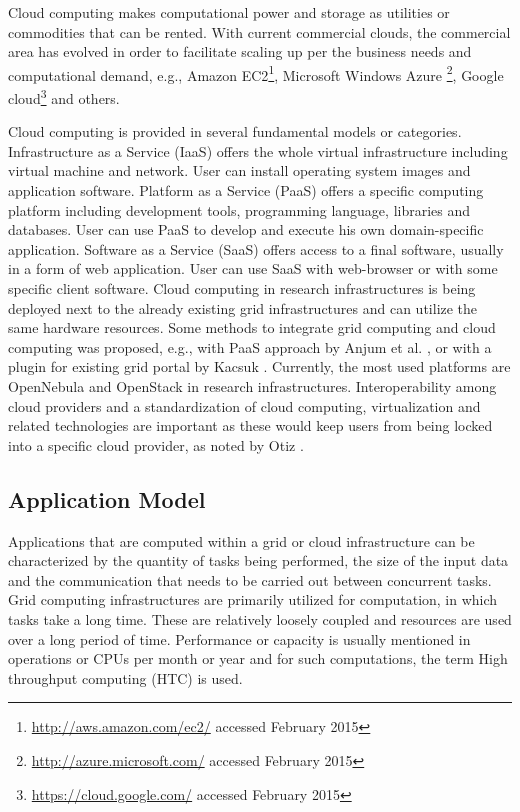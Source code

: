 Cloud computing makes computational power and storage as utilities or commodities that can be rented. With current commercial clouds, the commercial area has evolved in order to facilitate scaling up per the business needs and computational demand, e.g., Amazon EC2\footnote{\url{http://aws.amazon.com/ec2/} accessed February 2015}, Microsoft Windows Azure \footnote{\url{http://azure.microsoft.com/} accessed February 2015}, Google cloud\footnote{\url{https://cloud.google.com/} accessed February 2015} and others.
 
Cloud computing is provided in several fundamental models or categories. Infrastructure as a Service (IaaS) offers the whole virtual infrastructure including virtual machine and network. User can install operating system images and application software. Platform as a Service (PaaS) offers a specific computing platform including development tools, programming language, libraries and databases. User can use PaaS to develop and execute his own domain-specific application. Software as a Service (SaaS) offers access to a final software, usually in a form of web application. User can use SaaS with web-browser or with some specific client software.
Cloud computing in research infrastructures is being deployed next to the already existing grid infrastructures and can utilize the same hardware resources. Some methods to integrate grid computing and cloud computing was proposed, e.g., with PaaS approach by Anjum et al. \cite{Anjum2012}, or with a plugin for existing grid portal by Kacsuk \cite{Kacsuk2011}. Currently, the most used platforms are Open\-Nebula  \cite{Milojicic2011} and OpenStack \cite{Kumar2014} in research infrastructures. Interoperability among cloud providers and a standardization of cloud computing, virtualization and related technologies are important as these would keep users from being locked into a specific cloud provider, as noted by Otiz \cite{Ortiz2011}.

\subsection{Application Model}

Applications that are computed within a grid or cloud infrastructure can be characterized by the quantity of tasks being performed, the size of the input data and the communication that needs to be carried out between concurrent tasks. 
Grid computing infrastructures are primarily utilized for computation, in which tasks take a long time. These are relatively loosely coupled and resources are used over a long period of time. Performance or capacity is usually mentioned  in operations or CPUs per month or year and for such computations, the term High throughput computing (HTC) is used.

